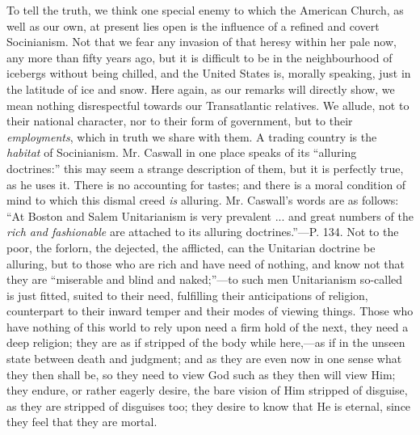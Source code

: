 To tell the truth, we think one special enemy to
which the American Church, as well as our own, at present lies open is
the influence of a refined and covert Socinianism. Not that we fear
any invasion of that heresy within her pale now, any more than fifty
years ago, but it is difficult to be in the neighbourhood of icebergs
without being chilled, and the United States is, morally speaking,
just in the latitude of ice and snow. Here again, as our remarks will
directly show, we mean nothing disrespectful towards our Transatlantic
relatives. We allude, not to their national character, nor to their
form of government, but to their \emph{employments}, which in truth we
share with them. A trading country is the \emph{habitat} of
Socinianism. Mr. Caswall in one place speaks of its ``alluring
doctrines:'' this may seem a strange description of them, but it is
perfectly true, as he uses it. There is no accounting for tastes; and
there is a moral condition of mind to which this dismal creed \emph{is}
alluring. Mr. Caswall's words are as follows: ``At Boston and Salem
Unitarianism is very prevalent ... and great numbers of the \emph{rich
and fashionable} are attached to its alluring doctrines.''—P. 134.
Not to the poor, the forlorn, the dejected, the afflicted, can
the Unitarian doctrine be alluring, but to those who are rich and have
need of nothing, and know not that they are ``miserable and blind and
naked;''—to such men Unitarianism so-called is just fitted, suited to
their need, fulfilling their anticipations of religion, counterpart to
their inward temper and their modes of viewing things. Those who have
nothing of this world to rely upon need a firm hold of the next, they
need a deep religion; they are as if stripped of the body while
here,—as if in the unseen state between death and judgment; and as
they are even now in one sense what they then shall be, so they need
to view God such as they then will view Him; they endure, or rather
eagerly desire, the bare vision of Him stripped of disguise, as they
are stripped of disguises too; they desire to know that He is eternal,
since they feel that they are mortal.


